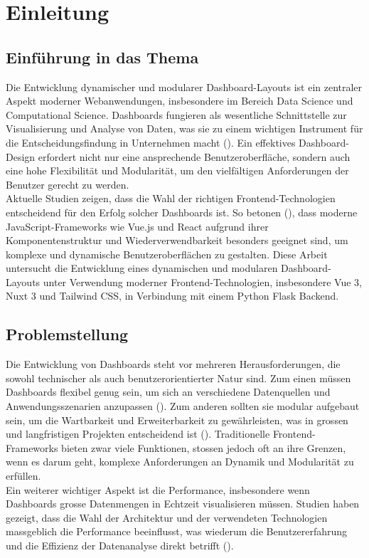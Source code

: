 \documentclass[a4paper, 12pt]{scrartcl}
\begin{document}
		
	\section{Einleitung}
	\label{sec:einleitung}

\subsection{Einführung in das Thema}
Die Entwicklung dynamischer und modularer Dashboard-Layouts ist ein zentraler Aspekt moderner Webanwendungen, insbesondere im Bereich Data Science und Computational Science. Dashboards fungieren als wesentliche Schnittstelle zur Visualisierung und Analyse von Daten, was sie zu einem wichtigen Instrument für die Entscheidungsfindung in Unternehmen macht (\cite[S.119]{Bach2022}). Ein effektives Dashboard-Design erfordert nicht nur eine ansprechende Benutzeroberfläche, sondern auch eine hohe Flexibilität und Modularität, um den vielfältigen Anforderungen der Benutzer gerecht zu werden.\\[1em] Aktuelle Studien zeigen, dass die Wahl der richtigen Frontend-Technologien entscheidend für den Erfolg solcher Dashboards ist. So betonen (\cite[S.119]{Raposo2022}), dass moderne JavaScript-Frameworks wie Vue.js und React aufgrund ihrer Komponentenstruktur und Wiederverwendbarkeit besonders geeignet sind, um komplexe und dynamische Benutzeroberflächen zu gestalten. Diese Arbeit untersucht die Entwicklung eines dynamischen und modularen Dashboard-Layouts unter Verwendung moderner Frontend-Technologien, insbesondere Vue 3, Nuxt 3 und Tailwind CSS, in Verbindung mit einem Python Flask Backend.

\subsection{Problemstellung}
Die Entwicklung von Dashboards steht vor mehreren Herausforderungen, die sowohl technischer als auch benutzerorientierter Natur sind. Zum einen müssen Dashboards flexibel genug sein, um sich an verschiedene Datenquellen und Anwendungsszenarien anzupassen (\cite[S.119]{Matheus2020}). Zum anderen sollten sie modular aufgebaut sein, um die Wartbarkeit und Erweiterbarkeit zu gewährleisten, was in grossen und langfristigen Projekten entscheidend ist (\cite[S.119]{Behrisch2018}). Traditionelle Frontend-Frameworks bieten zwar viele Funktionen, stossen jedoch oft an ihre Grenzen, wenn es darum geht, komplexe Anforderungen an Dynamik und Modularität zu erfüllen.\\[1em] Ein weiterer wichtiger Aspekt ist die Performance, insbesondere wenn Dashboards grosse Datenmengen in Echtzeit visualisieren müssen. Studien haben gezeigt, dass die Wahl der Architektur und der verwendeten Technologien massgeblich die Performance beeinflusst, was wiederum die Benutzererfahrung und die Effizienz der Datenanalyse direkt betrifft (\cite[S.119]{Shneiderman2006}).
\end{document}
